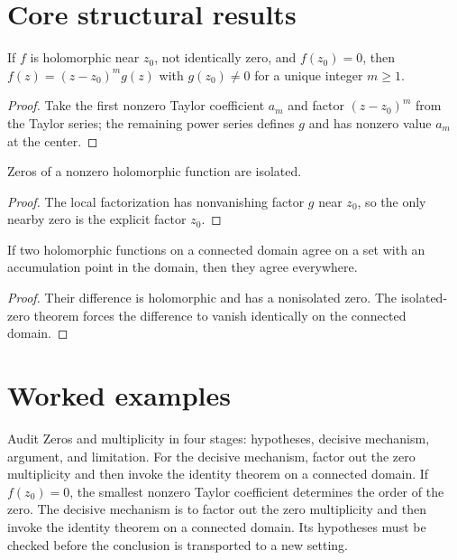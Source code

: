 \section{Core structural results}

\begin{theorem}\label{thm:iv07-01}
If $f$ is holomorphic near $z_0$, not identically zero, and $f(z_0)=0$, then $f(z)=(z-z_0)^mg(z)$ with $g(z_0)\ne0$ for a unique integer $m\ge1$.
\begin{proof}
Take the first nonzero Taylor coefficient $a_m$ and factor $(z-z_0)^m$ from the Taylor series; the remaining power series defines $g$ and has nonzero value $a_m$ at the center.
\end{proof}
\end{theorem}

\begin{theorem}\label{thm:iv07-02}
Zeros of a nonzero holomorphic function are isolated.
\begin{proof}
The local factorization has nonvanishing factor $g$ near $z_0$, so the only nearby zero is the explicit factor $z_0$.
\end{proof}
\end{theorem}

\begin{theorem}\label{thm:iv07-03}
If two holomorphic functions on a connected domain agree on a set with an accumulation point in the domain, then they agree everywhere.
\begin{proof}
Their difference is holomorphic and has a nonisolated zero. The isolated-zero theorem forces the difference to vanish identically on the connected domain.
\end{proof}
\end{theorem}

\section{Worked examples}

\begin{example}\label{ex:iv07-worked-01}
Audit Zeros and multiplicity in four stages: hypotheses, decisive mechanism, argument, and limitation. For the decisive mechanism, factor out the zero multiplicity and then invoke the identity theorem on a connected domain. If $f(z_0)=0$, the smallest nonzero Taylor coefficient determines the order of the zero. The decisive mechanism is to factor out the zero multiplicity and then invoke the identity theorem on a connected domain. Its hypotheses must be checked before the conclusion is transported to a new setting.
\end{example}

